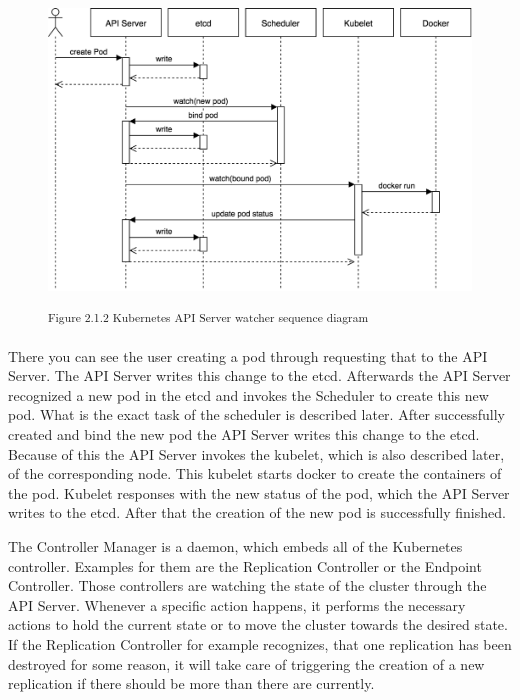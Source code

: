 \begin{figure}[h]
\centering
\includegraphics[width=\textwidth]{images/kubernetes_watcher_sequence.png}

\textsuperscript{Figure 2.1.2 Kubernetes API Server watcher sequence diagram}
\end{figure}

There you can see the user creating a pod through requesting that to the API Server. The API Server writes this change to the etcd. Afterwards the API Server recognized a new pod in the etcd and invokes the Scheduler to create this new pod. What is the exact task of the scheduler is described later. After successfully created and bind the new pod the API Server writes this change to the etcd. Because of this the API Server invokes the kubelet, which is also described later, of the corresponding node. This kubelet starts docker to create the containers of the pod. Kubelet responses with the new status of the pod, which the API Server writes to the etcd. After that the creation of the new pod is successfully finished.

The Controller Manager is a daemon, which embeds all of the Kubernetes controller. Examples for them are the Replication Controller or the Endpoint Controller. Those controllers are watching the state of the cluster through the API Server. Whenever a specific action happens, it performs the necessary actions to hold the current state or to move the cluster towards the desired state. If the Replication Controller for example recognizes, that one replication has been destroyed for some reason, it will take care of triggering the creation of a new replication if there should be more than there are currently.

